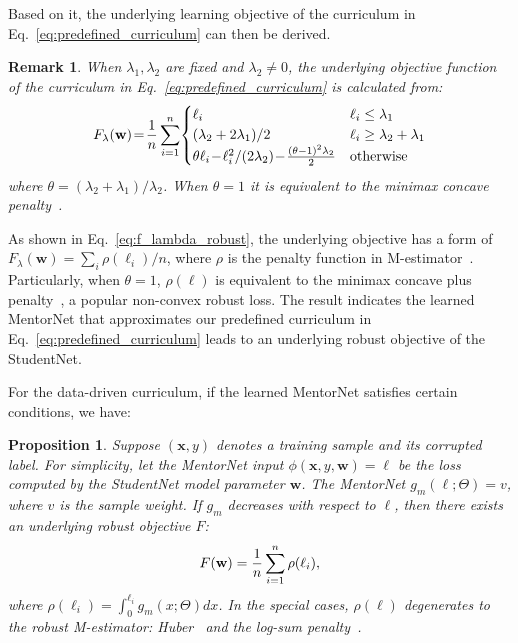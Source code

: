 \documentclass{article}
\newtheorem{proposition}{Proposition}
\newtheorem{remark}{Remark}
\begin{document}
Based on it, the underlying learning objective of the curriculum in Eq.~\eqref{eq:predefined_curriculum} can then be derived.
\begin{remark}
When $\lambda_1, \lambda_2$ are fixed and $\lambda_2 \ne 0$, the underlying objective function of the curriculum in Eq.~\eqref{eq:predefined_curriculum} is calculated from:
\vspace{-1mm}
\begin{equation}
\label{eq:f_lambda_robust}
F_\lambda (\mathbf{w}) \!=\! \frac{1}{n}\sum_{i=1}^n\!\begin{cases}
\ell_i & \ell_i \le \lambda_1\\
(\lambda_2 + 2\lambda_1)/ 2 & \ell_i \ge \lambda_2 + \lambda_1 \\
\theta \ell_i \!-\! \ell_i^2 /(2 \lambda_2) \!-\! \frac{(\theta-1)^2 \lambda_2}{2} & \text{otherwise}\\
\end{cases}
\vspace{-1mm}
\end{equation}
where $\theta = (\lambda_2+\lambda_1)/\lambda_2$. When $\theta=1$ it is equivalent to the minimax concave penalty~\cite{zhang2010nearly}.
\vspace{-2mm}
\end{remark}

As shown in Eq.~\eqref{eq:f_lambda_robust}, the underlying objective has a form of $F_\lambda(\mathbf{w}) = \sum_i \rho(\ell_i)/n$, where $\rho$ is the penalty function in M-estimator~\cite{candes2008enhancing}. Particularly, when $\theta=1$, $\rho(\ell)$ is equivalent to the minimax concave plus penalty~\cite{zhang2010nearly}, a popular non-convex robust loss. The result indicates the learned MentorNet that approximates our predefined curriculum in Eq.~\eqref{eq:predefined_curriculum} leads to an underlying robust objective of the StudentNet.

For the data-driven curriculum, if the learned MentorNet satisfies certain conditions, we have:
\begin{proposition}
Suppose $(\mathbf{x}, y)$ denotes a training sample and its corrupted label. For simplicity, let the MentorNet input $\phi(\mathbf{x}, y, \mathbf{w}) = \ell$ be the loss computed by the StudentNet model parameter $\mathbf{w}$. The MentorNet $g_m(\ell;\Theta) = v$, where $v$ is the sample weight. If $g_m$ decreases with respect to $\ell$, then there exists an underlying robust objective $F$:
\vspace{-2mm}
\[
F(\mathbf{w}) = \frac{1}{n} \sum_{i=1}^n \rho(\ell_i),
\vspace{-3mm}
\]
where $\rho(\ell_i)  = \int_0^{\ell_i} g_m(x;\Theta) d x$. In the special cases, $\rho(\ell)$ degenerates to the robust M-estimator: Huber~\cite{huber1964robust} and the log-sum
penalty~\cite{candes2008enhancing}.
\end{proposition}
\end{document}
